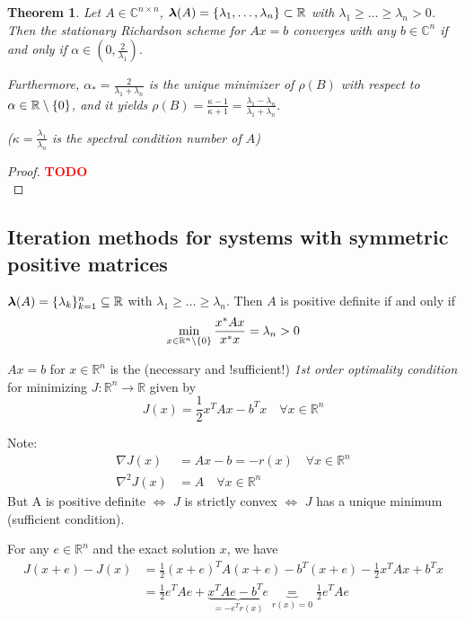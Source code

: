 \documentclass[12pt]{article}
\newcounter{lecture}
\newtheorem{theorem}{Theorem}[lecture]
\theoremstyle{definition}
\theoremstyle{remark}
\numberwithin{equation}{section}
\newcommand{\R}{\mathbb{R}}
\newcommand{\C}{\mathbb{C}}
\newcommand{\spectrum}[1]{\bm{\lambda}(#1)}
\newcommand{\TODO}[1][]{\textcolor{red}{\textbf{TODO\ifblank{#1}{}{:\ }#1}}\\}
\DeclarePairedDelimiter{\set}{\{}{\}}
\begin{document}
\begin{theorem}
  \label{thm:5.8}
  Let $A \in \C^{n\times n}$, $\spectrum{A} = \set{\lambda_1,\ldots,\lambda_n} \subset \R$ with $\lambda_1 \geq \ldots \geq \lambda_n > 0$. Then the stationary Richardson scheme for $Ax = b$ converges with any $b \in \C^n$ if and only if $\alpha \in (0, \frac{2}{\lambda_1})$.

  Furthermore, $\alpha_* = \frac{2}{\lambda_1+\lambda_n}$ is the unique minimizer of $\rho(B)$ with respect to $\alpha \in \R\setminus\set{0}$, and it yields $\rho(B) = \frac{\kappa - 1}{\kappa + 1} = \frac{\lambda_1 - \lambda_n}{\lambda_1 + \lambda_n}$.

  ($\kappa = \frac{\lambda_1}{\lambda_n}$ is the spectral condition number of $A$)
\end{theorem}
\begin{proof}
  \TODO
\end{proof}

\subsection*{Iteration methods for systems with symmetric positive matrices}
$\spectrum{A} = \set{\lambda_k}_{k=1}^n \subseteq \R$ with $\lambda_1 \geq \ldots \geq \lambda_n$. Then $A$ is positive definite if and only if
\begin{equation*}
  \min_{x \in \R^n \setminus \set{0}} \frac{x^*Ax}{x^*x} = \lambda_n > 0
\end{equation*}

$Ax = b$ for $x \in \R^n$ is the (necessary and !sufficient!) \emph{1st order optimality condition} for minimizing $J: \R^n \rightarrow \R$ given by
\begin{equation*}
  J(x) = \frac{1}{2}x^TAx - b^Tx \quad \forall x \in \R^n
\end{equation*}

Note:
\begin{align*}
  \nabla J(x) &= Ax - b = -r(x) \quad \forall x \in \R^n \\
  \nabla^2 J(x) &= A \quad \forall x \in \R^n
\end{align*}
But A is positive definite $\Leftrightarrow$ $J$ is strictly convex $\Leftrightarrow$ $J$ has a unique minimum (sufficient condition).

For any $e \in \R^n$ and the exact solution $x$, we have
\begin{align*}
  J(x+e) - J(x) &= \frac{1}{2}(x+e)^TA(x+e) - b^T(x+e) - \frac{1}{2}x^TAx + b^Tx \\
  &= \frac{1}{2}e^TAe + \underbrace{x^TAe - b^Te}_{=-e^T r(x)} \underbrace{=}_{{r(x) = 0}} \frac{1}{2}e^TAe
\end{align*}
\end{document}
